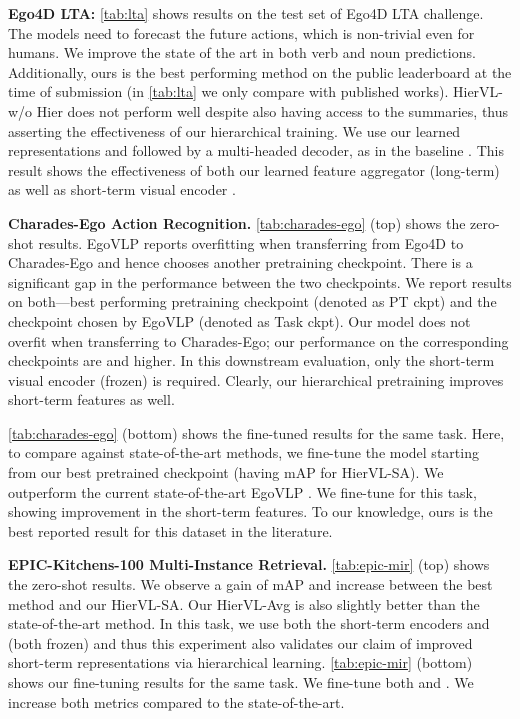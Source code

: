 \documentclass[10pt,twocolumn,letterpaper]{article}
\newcommand{\modelname}[0]{{HierVL}}
\begin{document}
\vspace*{0.15in}
\textbf{Ego4D LTA:} \cref{tab:lta} shows results on the test set of Ego4D LTA challenge. 
The models need to forecast the future  actions, which is non-trivial even for humans. We improve the state of the art in both verb and noun predictions. Additionally, ours is the best performing method on the public leaderboard at the time of submission  (in \cref{tab:lta} we only compare with published works).    \modelname-w/o Hier does not perform well despite also having access to the summaries, thus asserting the effectiveness of our hierarchical training. 
We use our learned representations  and  followed by a multi-headed decoder, as in the baseline \cite{ego4d}.
This result shows the effectiveness of both our learned feature aggregator (long-term) as well as short-term visual encoder .







\textbf{Charades-Ego Action Recognition.}
 \cref{tab:charades-ego} (top) shows the zero-shot results.
EgoVLP \cite{egovlp} reports overfitting when transferring from Ego4D to Charades-Ego and hence chooses another pretraining checkpoint. There is a significant gap in the performance between the two checkpoints. We report results on both---best performing pretraining checkpoint (denoted as PT ckpt) and the checkpoint chosen by EgoVLP (denoted as Task ckpt). Our model does not overfit when transferring to Charades-Ego; our performance on the corresponding checkpoints are  and  higher. In this downstream evaluation, only the short-term visual encoder  (frozen) is required. Clearly, our hierarchical pretraining improves short-term features as well.



\cref{tab:charades-ego} (bottom) shows the fine-tuned results for the same task.  Here, to compare against state-of-the-art methods, we fine-tune the model starting from our best pretrained checkpoint (having  mAP for \modelname-SA). We outperform the current state-of-the-art EgoVLP \cite{egovlp}. We fine-tune  for this task, showing improvement in the short-term features.  To our knowledge, ours is the best reported result for this dataset in the literature. 

\textbf{EPIC-Kitchens-100 Multi-Instance Retrieval.} 
\cref{tab:epic-mir} (top) shows the zero-shot results.
We observe a gain of  mAP and  increase between the best method and our \modelname-SA. Our \modelname-Avg is also slightly better than the state-of-the-art method. In this task, we use both the short-term encoders  and  (both frozen) and thus this experiment also validates our claim of improved short-term representations via hierarchical learning.  \cref{tab:epic-mir} (bottom) shows our fine-tuning results for the same task. 
We fine-tune both  and .
We increase both metrics  compared to the state-of-the-art. 
\end{document}
